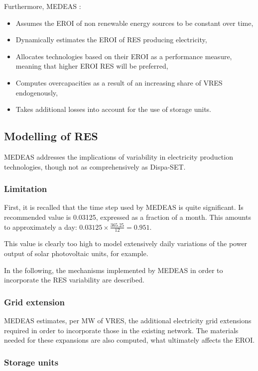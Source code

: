 Furthermore, MEDEAS \cite{medeas-eroi}:
\begin{itemize}
    \item Assumes the EROI of non renewable energy sources to be constant over time,
    \item Dynamically estimates the EROI of RES producing electricity,
    \item Allocates technologies based on their EROI as a performance measure, meaning that higher EROI RES will be preferred,
    \item Computes overcapacities as a result of an increasing share of VRES endogenously,
    \item Takes additional losses into account for the use of storage units.
\end{itemize}

\subsection{Modelling of RES}

MEDEAS addresses the implications of variability in electricity production technologies, though not as comprehensively as Dispa-SET.

\subsubsection{Limitation}

First, it is recalled that the time step used by MEDEAS is quite significant. Is recommended value is 0.03125, expressed as a fraction of a month. This amounts to approximately a day: $0.03125 \times \frac{365.25}{12} = 0.951$.

This value is clearly too high to model extensively daily variations of the power output of solar photovoltaic units, for example.

In the following, the mechanisms implemented by MEDEAS in order to incorporate the RES variability are described.

\subsubsection{Grid extension}

MEDEAS estimates, per MW of VRES, the additional electricity grid extensions required in order to incorporate those in the existing network. The materials needed for these expansions are also computed, what ultimately affects the EROI.

\subsubsection{Storage units}

